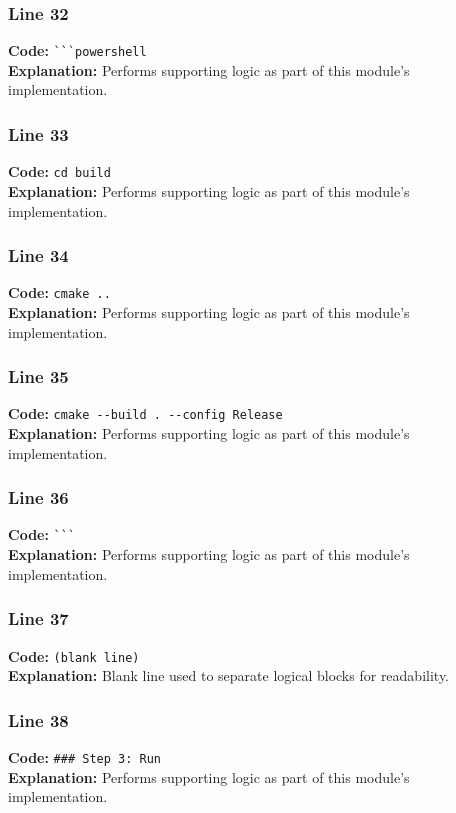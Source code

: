 \documentclass[11pt,a4paper]{article}
\begin{document}
\subsubsection*{Line 32}
\textbf{Code:} \verb|```powershell|\\
\textbf{Explanation:} Performs supporting logic as part of this module's implementation.

\subsubsection*{Line 33}
\textbf{Code:} \verb|cd build|\\
\textbf{Explanation:} Performs supporting logic as part of this module's implementation.

\subsubsection*{Line 34}
\textbf{Code:} \verb|cmake ..|\\
\textbf{Explanation:} Performs supporting logic as part of this module's implementation.

\subsubsection*{Line 35}
\textbf{Code:} \verb|cmake --build . --config Release|\\
\textbf{Explanation:} Performs supporting logic as part of this module's implementation.

\subsubsection*{Line 36}
\textbf{Code:} \verb|```|\\
\textbf{Explanation:} Performs supporting logic as part of this module's implementation.

\subsubsection*{Line 37}
\textbf{Code:} \texttt{(blank line)}\\
\textbf{Explanation:} Blank line used to separate logical blocks for readability.

\subsubsection*{Line 38}
\textbf{Code:} \verb|### Step 3: Run|\\
\textbf{Explanation:} Performs supporting logic as part of this module's implementation.
\end{document}

